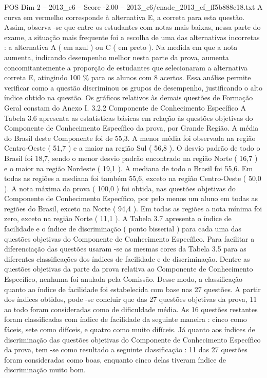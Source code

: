 \begin{textsample}{POS Dim 2 – 2013\_c6 – Score -2.00 – 2013\_c6/enade\_2013\_ef\_ff5b888e18.txt}
A curva em vermelho corresponde à alternativa E, a correta para esta questão.
Assim, observa -se que entre os estudantes com notas mais baixas, nessa parte do exame, a situação mais frequente foi a escolha de uma das alternativas incorretas : a alternativa A ( em azul ) ou C ( em preto ).
Na medida em que a nota aumenta, indicando desempenho melhor nesta parte da prova, aumenta concomitantemente a proporção de estudantes que selecionaram a alternativa correta E, atingindo 100 \% para os alunos com 8 acertos.
Essa análise permite verificar como a questão discriminou os grupos de desempenho, justificando o alto índice obtido na questão.
Os gráficos relativos às demais questões de Formação Geral constam do Anexo I. 3.2.2 Componente de Conhecimento Específico A Tabela 3.6 apresenta as estatísticas básicas em relação às questões objetivas do Componente de Conhecimento Específico da prova, por Grande Região.
A média do Brasil deste Componente foi de 55,3.
A menor média foi observada na região Centro-Oeste ( 51,7 ) e a maior na região Sul ( 56,8 ).
O desvio padrão de todo o Brasil foi 18,7, sendo o menor desvio padrão encontrado na região Norte ( 16,7 ) e o maior na região Nordeste ( 19,1 ).
A mediana de todo o Brasil foi 55,6.
Em todas as regiões a mediana foi também 55,6, exceto na região Centro-Oeste ( 50,0 ).
A nota máxima da prova ( 100,0 ) foi obtida, nas questões objetivas do Componente de Conhecimento Específico, por pelo menos um aluno em todas as regiões do Brasil, exceto na Norte ( 94,4 ).
Em todas as regiões a nota mínima foi zero, exceto na região Norte ( 11,1 ).
A Tabela 3.7 apresenta o índice de facilidade e o índice de discriminação ( ponto bisserial ) para cada uma das questões objetivas do Componente de Conhecimento Específico.
Para facilitar a diferenciação das questões usaram -se as mesmas cores da Tabela 3.5 para as diferentes classificações dos índices de facilidade e de discriminação.
Dentre as questões objetivas da parte da prova relativa ao Componente de Conhecimento Específico, nenhuma foi anulada pela Comissão.
Desse modo, a classificação quanto ao índice de facilidade foi estabelecida com base nas 27 questões.
A partir dos índices obtidos, pode -se concluir que das 27 questões objetivas da prova, 11 ao todo foram consideradas como de dificuldade média.
As 16 questões restantes foram classificadas com índice de facilidade da seguinte maneira : cinco como fáceis, sete como difíceis, e quatro como muito difíceis.
Já quanto aos índices de discriminação das questões objetivas do Componente de Conhecimento Específico da prova, tem -se como resultado a seguinte classificação : 11 das 27 questões foram consideradas como boas, enquanto cinco delas tiveram índice de discriminação muito bom.

\end{textsample}
